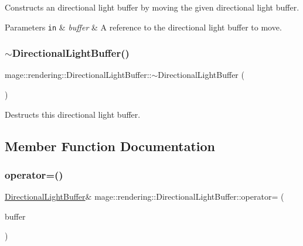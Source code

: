 Constructs an directional light buffer by moving the given directional light buffer.


\begin{DoxyParams}[1]{Parameters}
\mbox{\tt in}  & {\em buffer} & A reference to the directional light buffer to move. \\
\hline
\end{DoxyParams}
\mbox{\label{structmage_1_1rendering_1_1_directional_light_buffer_ac52791a07948b17670c13b4aa0ddb104}} 
\subsubsection{\texorpdfstring{$\sim$\+Directional\+Light\+Buffer()}{~DirectionalLightBuffer()}}
{\footnotesize\ttfamily mage\+::rendering\+::\+Directional\+Light\+Buffer\+::$\sim$\+Directional\+Light\+Buffer (\begin{DoxyParamCaption}{ }\end{DoxyParamCaption})\hspace{0.3cm}{\ttfamily [default]}}

Destructs this directional light buffer. 

\subsection{Member Function Documentation}
\mbox{\label{structmage_1_1rendering_1_1_directional_light_buffer_a99def3f5e0829a7925a0f83ab14c2b58}} 
\subsubsection{\texorpdfstring{operator=()}{operator=()}\hspace{0.1cm}{\footnotesize\ttfamily [1/2]}}
{\footnotesize\ttfamily \mbox{\hyperlink{structmage_1_1rendering_1_1_directional_light_buffer}{Directional\+Light\+Buffer}}\& mage\+::rendering\+::\+Directional\+Light\+Buffer\+::operator= (\begin{DoxyParamCaption}\item[{const \mbox{\hyperlink{structmage_1_1rendering_1_1_directional_light_buffer}{Directional\+Light\+Buffer}} \&}]{buffer }\end{DoxyParamCaption})\hspace{0.3cm}{\ttfamily [default]}}

